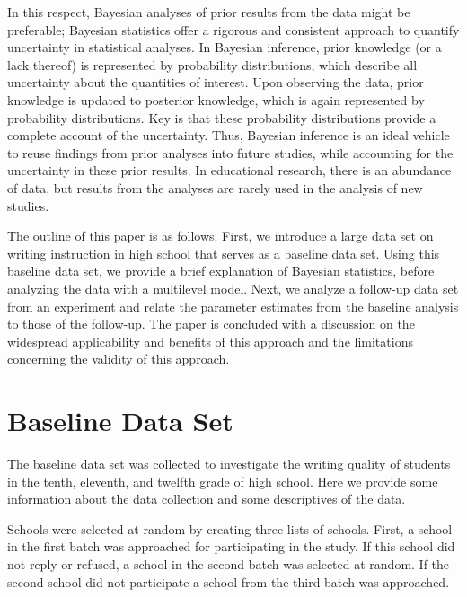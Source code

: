 \documentclass[a4paper]{article}
\newcommand{\DON}	[1] 	{\todo[			linecolor=gray, backgroundcolor=white]	{Don: 	{#1}}}
\newcommand{\DON}	[1] 	{}
\begin{document}
In this respect, Bayesian analyses of prior results from the data might be preferable; Bayesian statistics offer a rigorous and consistent approach to quantify uncertainty in statistical analyses. In Bayesian inference, prior knowledge (or a lack thereof) is represented by probability distributions, which describe all uncertainty about the quantities of interest. Upon observing the data, prior knowledge is updated to posterior knowledge, which is again represented by probability distributions. Key is that these probability distributions provide a complete account of the uncertainty. Thus, Bayesian inference is an ideal vehicle to reuse findings from prior analyses into future studies, while accounting for the uncertainty in these prior results. In educational research, there is an abundance of data, but results from the analyses are rarely used in the analysis of new studies.

The outline of this paper is as follows. 
First, we introduce a large data set on writing instruction in high school that serves as a baseline data set. 
Using this baseline data set, we provide a brief explanation of Bayesian statistics, before analyzing the data with a multilevel model. 
Next, we analyze a follow-up data set from an experiment and relate the parameter estimates from the baseline analysis to those of the follow-up. 
The paper is concluded with a discussion on the widespread applicability and benefits of this approach and the limitations concerning the validity of this approach.



\section*{Baseline Data Set}
\noindent The baseline data set was collected to investigate the writing quality of students in the tenth, eleventh, and twelfth grade of high school. Here we provide some information about the data collection and some descriptives of the data.

Schools were selected at random by creating three lists of schools. First, a school in the first batch was approached for participating in the study. If this school did not reply or refused, a school in the second batch was selected at random. If the second school did not participate a school from the third batch was approached.
\end{document}
